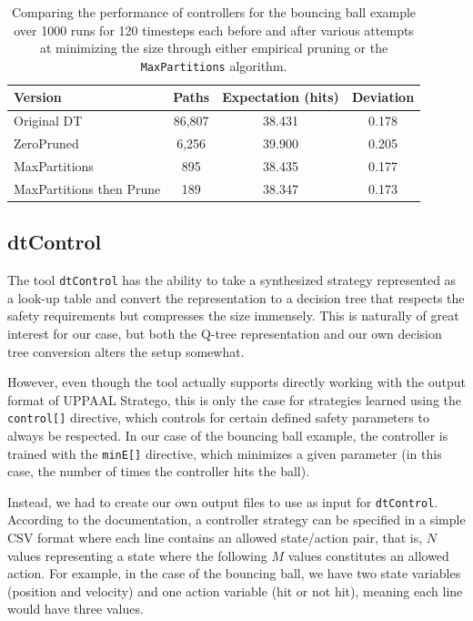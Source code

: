 \documentclass{article}
\begin{document}
\begin{table}[ht]
    \centering
    \caption{%
        Comparing the performance of controllers for the bouncing ball example
        over 1000 runs for 120 timesteps each before and after various attempts
        at minimizing the size through either empirical pruning or the
        \texttt{MaxPartitions} algorithm.
    }\label{tab:minimizedResults}
    \begin{tabular}[t]{lccc}
        \toprule
        Version & Paths & Expectation (hits) & Deviation \\
        \midrule
        Original DT & 86,807 & 38.431 & 0.178 \\
        ZeroPruned & 6,256 & 39.900 & 0.205 \\
        MaxPartitions & 895 & 38.435 & 0.177 \\
        MaxPartitions then Prune & 189 & 38.347 & 0.173 \\
        \bottomrule
    \end{tabular}
\end{table}


\subsection{dtControl}%
\label{subsec:dtControl}

The tool \texttt{dtControl} has the ability to take a synthesized strategy
represented as a look-up table and convert the representation to a decision
tree that respects the safety requirements but compresses the size immensely.
This is naturally of great interest for our case, but both the Q-tree
representation and our own decision tree conversion alters the setup somewhat.

However, even though the tool actually supports directly working with the output
format of UPPAAL Stratego, this is only the case for strategies learned using
the \texttt{control[]} directive, which controls for certain defined safety
parameters to always be respected. In our case of the bouncing ball example, the
controller is trained with the \texttt{minE[]} directive, which minimizes a
given parameter (in this case, the number of times the controller hits the
ball).

Instead, we had to create our own output files to use as input for
\texttt{dtControl}. According to the documentation, a controller strategy can be
specified in a simple CSV format where each line contains an allowed
state/action pair, that is, $N$ values representing a state where the following
$M$ values constitutes an allowed action. For example, in the case of the
bouncing ball, we have two state variables (position and velocity) and one action
variable (hit or not hit), meaning each line would have three values.
\end{document}
